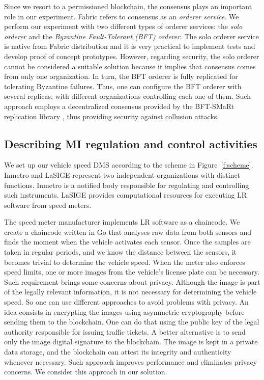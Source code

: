\documentclass[journal]{IEEEtran}
\begin{document}
Since we resort to a permissioned blockchain, the consensus plays an important role in our experiment.
Fabric refers to consensus as an \emph{orderer service}.
We perform our experiment with two different types of orderer services: the \emph{solo orderer} and the \emph{Byzantine Fault-Tolerant (BFT) orderer}.
The solo orderer service is native from Fabric distribution and it is very practical to implement tests and develop proof of concept prototypes.
However, regarding security, the solo orderer cannot be considered a suitable solution because it implies that consensus comes from only one organization.
In turn, the BFT orderer \cite{Sousa2018} is fully replicated for tolerating Byzantine failures.
Thus, one can configure the BFT orderer with several replicas, with different organizations controlling each one of them.
Such approach employs a decentralized consensus provided by the BFT-SMaRt replication library \cite{Bessani2014}, thus providing security against collusion attacks.

\subsection{Describing MI regulation and control activities}
We set up our vehicle speed DMS according to the scheme in Figure~\ref{f:scheme}.
Inmetro and LaSIGE represent two independent organizations with distinct functions.
Inmetro is a notified body responsible for regulating and controlling such instruments.
LaSIGE provides computational resources for executing LR software from speed meters.

The speed meter manufacturer implements LR software as a chaincode. 
We create a chaincode written in Go that analyses raw data from both sensors and finds the moment when the vehicle activates each sensor.
Once the samples are taken in regular periods, and we know the distance between the sensors, it becomes trivial to determine the vehicle speed.
When the meter also enforces speed limits, one or more images from the vehicle's license plate can be necessary.
Such requirement brings some concerns about privacy.
Although the image is part of the legally relevant information, it is not necessary for determining the vehicle speed.
So one can use different approaches to avoid problems with privacy.
An idea consists in encrypting the images using asymmetric cryptography before sending them to the blockchain.
One can do that using the public key of the legal authority responsible for issuing traffic tickets.
A better alternative is to send only the image digital signature to the blockchain.
The image is kept in a private data storage, and the blockchain can attest its integrity and authenticity whenever necessary.
Such approach improves performance and eliminates privacy concerns.
We consider this approach in our solution.
\end{document}

